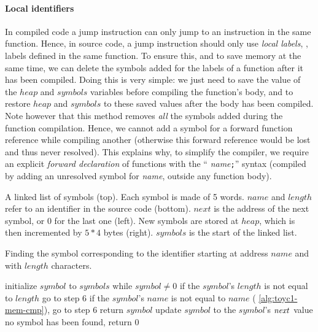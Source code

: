 \bigskip \paragraph*{Local identifiers} In compiled code a jump instruction can
only jump to an instruction in the same function. Hence, in source code, a jump
instruction should only use {\em local labels}, \ie, labels defined in the same
function. To ensure this, and to save memory at the same time, we can delete
the symbols added for the labels of a function after it has been compiled.
Doing this is very simple: we just need to save the value of the $heap$ and
$symbols$ variables before compiling the function's body, and to restore $heap$
and $symbols$ to these saved values after the body has been compiled. Note
however that this method removes {\em all} the symbols added during the
function compilation. Hence, we cannot add a symbol for a forward function
reference while compiling another (otherwise this forward reference would be
lost and thus never resolved). This explains why, to simplify the compiler, we
require an explicit {\em forward declaration} of functions with the ``
{\em name}{\tt ;}'' syntax (compiled by adding an unresolved symbol for {\em
name}, outside any function body).

\begin{Figure}
  

  \caption{A linked list of symbols (top). Each symbol is made of 5 words.
  $name$ and $length$ refer to an identifier in the source code (bottom).
  $next$ is the address of the next symbol, or 0 for the last one (left). New
  symbols are stored at $heap$, which is then incremented by $5*4$ bytes
  (right). $symbols$ is the start of the linked
  list.}\label{fig:toyc1-symbols-list}
\end{Figure}

\begin{Algorithm}
\caption{Finding the symbol corresponding to the identifier starting at address
$name$ and with $length$ characters.}\label{alg:toyc1-sym-lookup}
\begin{algorithmic}[1]
\State initialize $symbol$ to $symbols$
\Begin while $symbol \ne 0$
  \State if the $symbol$'s $length$ is not equal to $length$ go to step 6
  \State if the $symbol$'s $name$ is not equal to $name$ (\cf
    \cref{alg:toyc1-mem-cmp}), go to step 6
  \State return $symbol$
  \State update $symbol$ to the $symbol$'s $\it{next}$ value
\End
\State no symbol has been found, return 0
\end{algorithmic}
\end{Algorithm}

